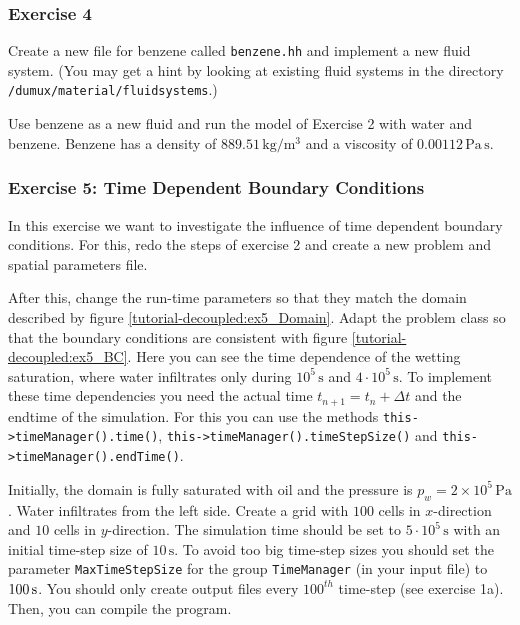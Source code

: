 \subsubsection{Exercise 4}
Create a new file for benzene called \texttt{benzene.hh} and implement
a new fluid system. (You may get a hint by looking at existing fluid 
systems in the directory \verb+/dumux/material/fluidsystems+.)

Use benzene as a new fluid and run the model of Exercise 2 with water
and benzene. Benzene has a density of $889.51 \, \text{kg} / \text{m}^3$
and a viscosity of $0.00112 \, \text{Pa} \, \text{s}$. 

\subsubsection{Exercise 5: Time Dependent Boundary Conditions}

In this exercise we want to investigate the influence of time dependent boundary conditions. For this, redo the steps of exercise 2 and create a new problem and spatial parameters file. 

After this, change the run-time parameters so that they match the
domain described by figure \ref{tutorial-decoupled:ex5_Domain}. Adapt
the problem class so that the boundary conditions are consistent with
figure \ref{tutorial-decoupled:ex5_BC}. Here you can see the time dependence of the wetting saturation, where water infiltrates only during $10^5\,\text{s}$ and $4 \cdot 10^5\,\text{s}$. To implement these time dependencies you need the actual time $t_{n+1}=t_n + \Delta t$ and the endtime of the simulation. For this you can use the methods \texttt{this->timeManager().time()}, \texttt{this->timeManager().timeStepSize()} and \texttt{this->timeManager().endTime()}. 

Initially, the domain is fully saturated with oil and the pressure is $p_w = 2 \times
10^5\,\text{Pa}$.  Water infiltrates from the left side. Create a grid
with $100$ cells in $x$-direction and $10$ cells in $y$-direction. The
simulation time should be set to $5 \cdot 10^5\,\text{s}$ with an
initial time-step size of $10\,\text{s}$. To avoid too big time-step sizes you should set the parameter \texttt{MaxTimeStepSize} for the group \texttt{TimeManager} (in your input file) to $\unit[100]{s}$. You should only create output files every $100^{th}$ time-step (see exercise 1a). Then, you can compile the program.

